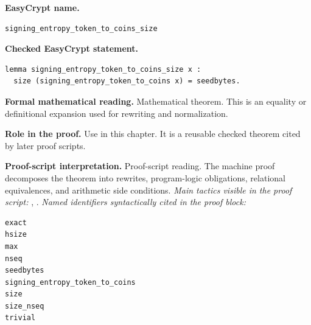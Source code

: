 \begin{formaltheorem}
\noindent\textbf{EasyCrypt name.}
\begin{lstlisting}[language=EasyCrypt,basicstyle=\ttfamily\scriptsize]
signing_entropy_token_to_coins_size
\end{lstlisting}
\noindent\textbf{Checked EasyCrypt statement.}
\begin{lstlisting}[language=EasyCrypt,basicstyle=\ttfamily\scriptsize]
lemma signing_entropy_token_to_coins_size x :
  size (signing_entropy_token_to_coins x) = seedbytes.
\end{lstlisting}
\noindent\textbf{Formal mathematical reading.}
Mathematical theorem. This is an equality or definitional expansion used for rewriting and normalization.

\noindent\textbf{Role in the proof.}
Use in this chapter. It is a reusable checked theorem cited by later proof scripts.

\noindent\textbf{Proof-script interpretation.}
Proof-script reading. The machine proof decomposes the theorem into rewrites, program-logic obligations, relational equivalences, and arithmetic side conditions.
\emph{Main tactics visible in the proof script:} , .
\emph{Named identifiers syntactically cited in the proof block:}
\begin{lstlisting}[language=EasyCrypt,basicstyle=\ttfamily\scriptsize]
exact
hsize
max
nseq
seedbytes
signing_entropy_token_to_coins
size
size_nseq
trivial
\end{lstlisting}

\end{formaltheorem}

